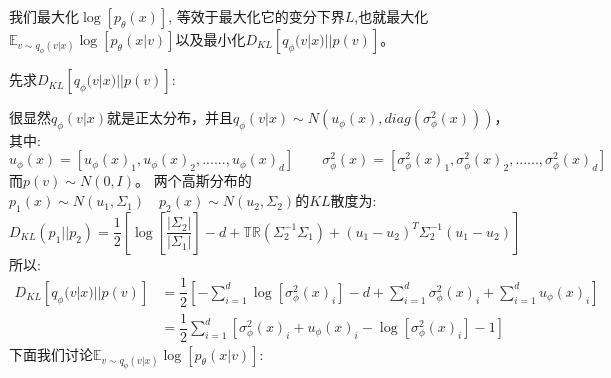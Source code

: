\documentclass[withoutpreface,bwprint]{cumcmthesis} %
\begin{document}
	我们最大化$\log \left[ p_{\theta}(x) \right]$,
	等效于最大化它的变分下界$L$,也就最大化$\mathbb{E}_{ v \sim q_{\phi}(v|x) }  \log \left[ p_{\theta}(x|v) \right] $以及最小化$D_{KL} \left[ q_{\phi}(v|x)||p(v) \right]$。
	

	
	先求$D_{KL} \left[ q_{\phi}(v|x)||p(v) \right]$:
	
		很显然$ q_{\phi}(v|x)$就是正太分布，并且$ q_{\phi}(v|x) \sim N(u_{\phi}(x),diag(\sigma^2_{\phi}(x))) $，其中:
		$$
			u_{\phi}(x)=\left[u_{\phi}(x)_1, u_{\phi}(x)_2, ......,u_{\phi}(x)_d\right]
			\quad \quad
			\sigma^2_{\phi}(x)= \left[\sigma^2_{\phi}(x)_1, \sigma^2_{\phi}(x)_2, ......,\sigma^2_{\phi}(x)_d\right]
		$$
	而$p(v) \sim N(0,I)$。
	两个高斯分布的$p_1(x) \sim N(u_1,\Sigma_1) \quad p_2(x) \sim N(u_2,\Sigma_2)$的$KL$散度为:
	$$
		D_{KL}(p_1||p_2) = \dfrac{1}{2} \left[
			\log\left[\dfrac{|\Sigma_2|}{|\Sigma_1|}\right] -d + \mathbb{ TR } \left( \Sigma_2^{-1} \Sigma_1 \right) + (u_1-u_2)^T\Sigma_2^{-1}(u_1-u_2)
		\right]
	$$
	所以:
	\begin{align*}
		D_{KL} \left[ q_{\phi}(v|x)||p(v) \right] & = \dfrac{1}{2} \left[ 
				-\sum_{i=1}^{d}  \log \left[ \sigma^2_{\phi}(x)_i \right] -d + \sum_{i=1}^{d} \sigma^2_{\phi}(x)_i + \sum_{i=1}^{d} u_{\phi}(x)_i
		\right]\\
		& =  \dfrac{1}{2} \sum_{i=1}^{d} \left[  \sigma^2_{\phi}(x)_i +  u_{\phi}(x)_i  - \log \left[ \sigma^2_{\phi}(x)_i \right] -1 \right]
	\end{align*}
	下面我们讨论$ \mathbb{E}_{ v \sim q_{\phi}(v|x)} \log \left[ p_{\theta}(x|v) \right]$:
	
\end{document}
